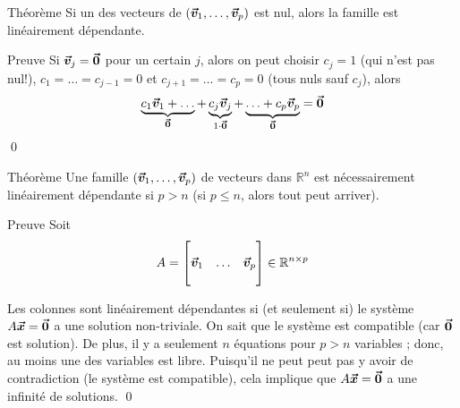 \documentclass{article}
\begin{document}
\begin{parag}{Théorème}
    Si un des vecteurs de $\left(\bvec{v}_1, \ldots, \bvec{v}_p\right)$ est nul, alors la famille est linéairement dépendante.

    \begin{subparag}{Preuve}
        Si $\bm{\protect\vec{v}}_j = \bm{\protect\vec{0}}$ pour un certain $j$, alors on peut choisir $c_j = 1$ (qui n'est pas nul!), $c_1 = \ldots = c_{j-1} = 0$ et $c_{j+1} = \ldots = c_p = 0$ (tous nuls sauf $c_j$), alors 
        \[\underbrace{c_1 \bm{\protect\vec{v}}_1 + \ldots}_{\bm{\protect\vec{0}}} + \underbrace{c_j \bm{\protect\vec{v}}_j}_{1\cdot\bm{\protect\vec{0}}} + \underbrace{\ldots + c_p \bm{\protect\vec{v}}_p}_{\bm{\protect\vec{0}}} = \bm{\protect\vec{0}}\]
        \qed
    \end{subparag}
    
\end{parag}

\begin{parag}{Théorème}
    Une famille $\left(\bvec{v}_1, \ldots, \bvec{v}_p\right)$ de vecteurs dans $\mathbb{R}^{n}$ est nécessairement linéairement dépendante si $p > n$ (si $p \leq n$, alors tout peut arriver).

    \begin{subparag}{Preuve}
        Soit 
        \[A = \begin{bmatrix}  &  &  \\ \bm{\protect\vec{v}}_1 & \ldots & \bm{\protect\vec{v}}_p \\  &  &  \end{bmatrix} \in \mathbb{R}^{n \times p}\]

        Les colonnes sont linéairement dépendantes si (et seulement si) le système $A \bm{\protect\vec{x}} = \bm{\protect\vec{0}}$ a une solution non-triviale. On sait que le système est compatible (car $\bm{\protect\vec{0}}$ est solution). De plus, il y a seulement $n$ équations pour $p > n$ variables ; donc, au moins une des variables est libre. Puisqu'il ne peut peut pas y avoir de contradiction (le système est compatible), cela implique que $A \bm{\protect\vec{x}} = \bm{\protect\vec{0}}$ a une infinité de solutions.
        \qed
    \end{subparag}
    
\end{parag}
\end{document}
